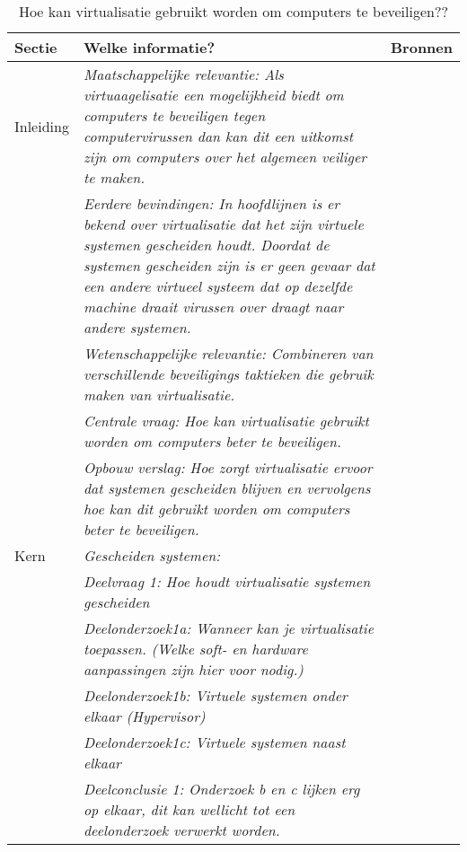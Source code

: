 \documentclass[a4paper]{article}
\begin{document}
\begin{longtable}{  p{35pt} p{300pt} p{50pt} }
    \caption{Hoe kan virtualisatie gebruikt worden om computers te beveiligen??}\\
    \textbf{Sectie} &  \textbf{Welke informatie?} &  \textbf{Bronnen} \\ \hline

    Inleiding 	& \textit{Maatschappelijke relevantie: Als virtuaagelisatie een mogelijkheid biedt om computers
                te beveiligen tegen computervirussen dan kan dit een uitkomst zijn
                om computers over het algemeen veiliger te maken.} & \cite{heiser2008role} \\ \cline{2-3}
    		&  \textit{Eerdere bevindingen: In hoofdlijnen is er bekend over virtualisatie dat het zijn virtuele systemen
            gescheiden houdt. Doordat de systemen gescheiden zijn is er geen gevaar dat
            een andere virtueel systeem dat op dezelfde machine draait virussen over draagt naar andere systemen.}& \\ \cline{2-3}
		&  \textit{Wetenschappelijke relevantie: Combineren van verschillende beveiligings taktieken die gebruik
                                                maken van virtualisatie.} & \\ \cline{2-3}
		&  \textit{Centrale vraag: Hoe kan virtualisatie gebruikt worden om computers beter te beveiligen.}& \\ \cline{2-3}
		&  \textit{Opbouw verslag: Hoe zorgt virtualisatie ervoor dat systemen gescheiden blijven
                                   en vervolgens hoe kan dit gebruikt worden om computers beter te beveiligen.} & \\ \hline

     Kern	& \textit{Gescheiden systemen:} &  \\ \cline{2-3}
		& \textit{Deelvraag 1: Hoe houdt virtualisatie systemen gescheiden} & \cite{heiser2008role} \\ \cline{2-3}
        & \textit{Deelonderzoek1a: Wanneer kan je virtualisatie toepassen. (Welke soft- en hardware aanpassingen zijn hier voor nodig.)} & \cite{adams2006comparison} \\ \cline{2-3}
		& \textit{Deelonderzoek1b: Virtuele systemen onder elkaar (Hypervisor)} &  \\ \cline{2-3}
		& \textit{Deelonderzoek1c: Virtuele systemen naast elkaar} &  \\ \cline{2-3}
		& \textit{Deelconclusie 1: Onderzoek b en c lijken erg op elkaar, dit kan wellicht tot een deelonderzoek verwerkt worden.} &  \\ \cline{2-3}


\end{longtable}
\end{document}
